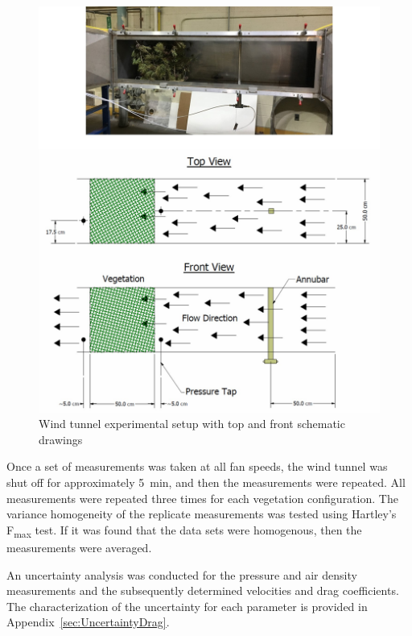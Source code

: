 \documentclass[12pt]{article}
\begin{document}
\begin{figure} [!]
	\centering 	
    \includegraphics[width=\textwidth,keepaspectratio]{Picture6a.jpg}
	\caption[Wind tunnel experimental setup]{Wind tunnel experimental setup with top and front schematic drawings }
	\label{fig:WindtunnelPic}
\end{figure}


Once a set of measurements was taken at all fan speeds, the wind tunnel was shut off for approximately 5~\si{min}, and then the measurements were repeated. All measurements were repeated three times for each vegetation configuration. The variance homogeneity of the replicate measurements was tested using Hartley's F\textsubscript{max} test. If it was found that the data sets were homogenous, then the measurements were averaged.

An uncertainty analysis was conducted for the pressure and air density measurements and the subsequently determined velocities and drag coefficients. The characterization of the uncertainty for each parameter is provided in Appendix~\ref{sec:UncertaintyDrag}.
\end{document}
